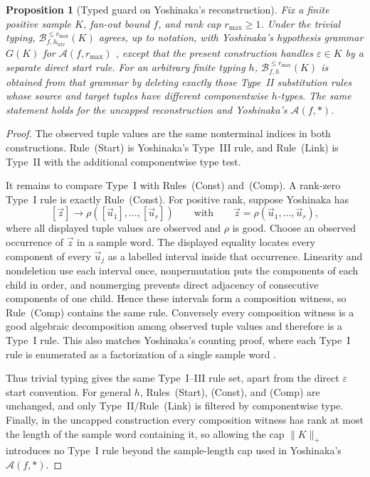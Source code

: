 \documentclass[11pt]{article}
\numberwithin{equation}{section}
\theoremstyle{plain}
\newtheorem{proposition}[theorem]{Proposition}
\theoremstyle{definition}
\theoremstyle{remark}
\newcommand{\tuple}[1]{\vec{#1}}
\newcommand{\eps}{\varepsilon}
\theoremstyle{plain}
\begin{document}
\begin{proposition}[Typed guard on Yoshinaka's reconstruction]
\label{prop:yoshinaka-type-guard}
Fix a finite positive sample $K$, fan-out bound $f$, and rank cap
$r_{\max}\ge1$.  Under the trivial typing,
$\mathcal B_{f,h_{\mathrm{triv}}}^{\le r_{\max}}(K)$ agrees, up to notation,
with Yoshinaka's hypothesis grammar $G(K)$ for $\mathcal A(f,r_{\max})$
\cite[Section~4.1]{Yoshinaka2011}, except that the present construction handles
$\eps\in K$ by a separate direct start rule.  For an arbitrary finite typing
$h$, $\mathcal B_{f,h}^{\le r_{\max}}(K)$ is obtained from that grammar by
deleting exactly those Type~II substitution rules whose source and target
tuples have different componentwise $h$-types.  The same statement holds for
the uncapped reconstruction and Yoshinaka's $\mathcal A(f,*)$.
\end{proposition}
\begin{proof}
The observed tuple values are the same nonterminal indices in both
constructions.  Rule~(Start) is Yoshinaka's Type~III rule, and Rule~(Link) is
Type~II with the additional componentwise type test.

It remains to compare Type~I with Rules~(Const) and~(Comp).  A rank-zero
Type~I rule is exactly Rule~(Const).  For positive rank, suppose Yoshinaka has
\[
 [\tuple z]\to\rho([\tuple u_1],\ldots,[\tuple u_r])
 \qquad\text{with}\qquad
 \tuple z=\rho(\tuple u_1,\ldots,\tuple u_r),
\]
where all displayed tuple values are observed and $\rho$ is good.  Choose an
observed occurrence of $\tuple z$ in a sample word.  The displayed equality
locates every component of every $\tuple u_j$ as a labelled interval inside
that occurrence.  Linearity and nondeletion use each interval once,
nonpermutation puts the components of each child in order, and nonmerging
prevents direct adjacency of consecutive components of one child.  Hence these
intervals form a composition witness, so Rule~(Comp) contains the same rule.
Conversely every composition witness is a good algebraic decomposition among
observed tuple values and therefore is a Type~I rule.  This also matches
Yoshinaka's counting proof, where each Type~I rule is enumerated as a
factorization of a single sample word
\cite[Lemma~6]{Yoshinaka2011}.

Thus trivial typing gives the same Type~I--III rule set, apart from the direct
$\eps$ start convention.  For general $h$, Rules~(Start), (Const), and (Comp)
are unchanged, and only Type~II/Rule~(Link) is filtered by componentwise type.
Finally, in the uncapped construction every composition witness has rank at
most the length of the sample word containing it, so allowing the cap
$\|K\|_+$ introduces no Type~I rule beyond the sample-length cap used in
Yoshinaka's $\mathcal A(f,*)$.
\end{proof}
\end{document}
